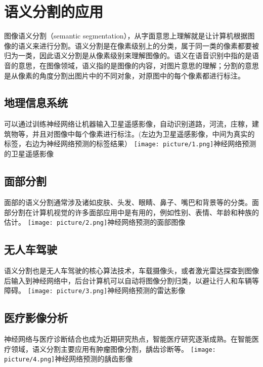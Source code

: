 \section{语义分割的应用}

图像语义分割（semantic
segmentation），从字面意思上理解就是让计算机根据图像的语义来进行分割。语义分割是在像素级别上的分类，属于同一类的像素都要被归为一类，因此语义分割是从像素级别来理解图像的。语义在语音识别中指的是语音的意思，在图像领域，语义指的是图像的内容，对图片意思的理解；分割的意思是从像素的角度分割出图片中的不同对象，对原图中的每个像素都进行标注。

\subsection{地理信息系统}

可以通过训练神经网络让机器输入卫星遥感影像，自动识别道路，河流，庄稼，建筑物等，并且对图像中每个像素进行标注。(左边为卫星遥感影像，中间为真实的标签，右边为神经网络预测的标签结果）
\texttt{[image: picture/1.png]}神经网络预测的卫星遥感影像

\subsection{面部分割}

面部的语义分割通常涉及诸如皮肤、头发、眼睛、鼻子、嘴巴和背景等的分类。面部分割在计算机视觉的许多面部应用中是有用的，例如性别、表情、年龄和种族的估计。
\texttt{[image: picture/2.png]}神经网络预测的面部图像

\subsection{无人车驾驶}

语义分割也是无人车驾驶的核心算法技术，车载摄像头，或者激光雷达探查到图像后输入到神经网络中，后台计算机可以自动将图像分割归类，以避让行人和车辆等障碍。
\texttt{[image: picture/3.png]}神经网络预测的雷达影像

\subsection{医疗影像分析}

神经网络与医疗诊断结合也成为近期研究热点，智能医疗研究逐渐成熟。在智能医疗领域，语义分割主要应用有肿瘤图像分割，龋齿诊断等。
\texttt{[image: picture/4.png]}神经网络预测的龋齿影像
